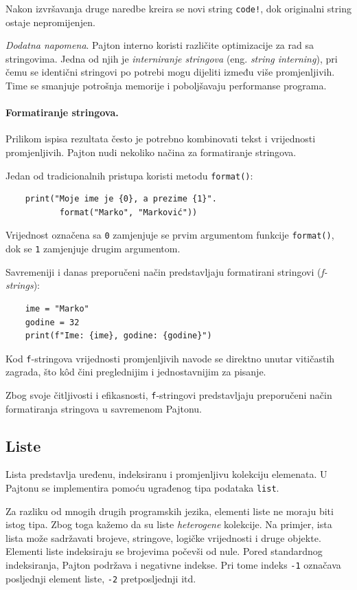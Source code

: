 Nakon izvršavanja druge naredbe kreira se novi string \texttt{code!}, dok originalni string ostaje nepromijenjen.

\textit{Dodatna napomena}. Pajton interno koristi različite optimizacije za rad sa stringovima. Jedna od njih je \textit{interniranje stringova} (eng. \textit{string interning}), pri čemu se identični stringovi po potrebi mogu dijeliti između više promjenljivih. Time se smanjuje potrošnja memorije i poboljšavaju performanse programa.

\paragraph{Formatiranje stringova.} Prilikom ispisa rezultata često je potrebno kombinovati tekst i vrijednosti promjenljivih. Pajton nudi nekoliko načina za formatiranje stringova.

Jedan od tradicionalnih pristupa koristi metodu \texttt{format()}:

\begin{verbatim}
	print("Moje ime je {0}, a prezime {1}".
	       format("Marko", "Marković"))
\end{verbatim}

Vrijednost označena sa \texttt{{0}} zamjenjuje se prvim argumentom funkcije \texttt{format()}, dok se \texttt{{1}} zamjenjuje drugim argumentom.

Savremeniji i danas preporučeni način predstavljaju formatirani stringovi (\textit{f-strings}):

\begin{verbatim}
	ime = "Marko"
	godine = 32
	print(f"Ime: {ime}, godine: {godine}")
\end{verbatim}

Kod \texttt{f}-stringova vrijednosti promjenljivih navode se direktno unutar vitičastih zagrada, što k\^od čini preglednijim i jednostavnijim za pisanje.

Zbog svoje čitljivosti i efikasnosti, \texttt{f}-stringovi predstavljaju preporučeni način formatiranja stringova u savremenom Pajtonu.


\subsection{Liste}

Lista predstavlja uređenu, indeksiranu i promjenljivu kolekciju elemenata. U Pajtonu se implementira pomoću ugrađenog tipa podataka \texttt{list}.

Za razliku od mnogih drugih programskih jezika, elementi liste ne moraju biti istog tipa. Zbog toga kažemo da su liste \textit{heterogene} kolekcije. Na primjer, ista lista može sadržavati brojeve, stringove, logičke vrijednosti i druge objekte.  Elementi liste indeksiraju se brojevima počevši od nule. Pored standardnog indeksiranja, Pajton podržava i negativne indekse. Pri tome indeks \texttt{-1} označava posljednji element liste, \texttt{-2} pretposljednji itd.

